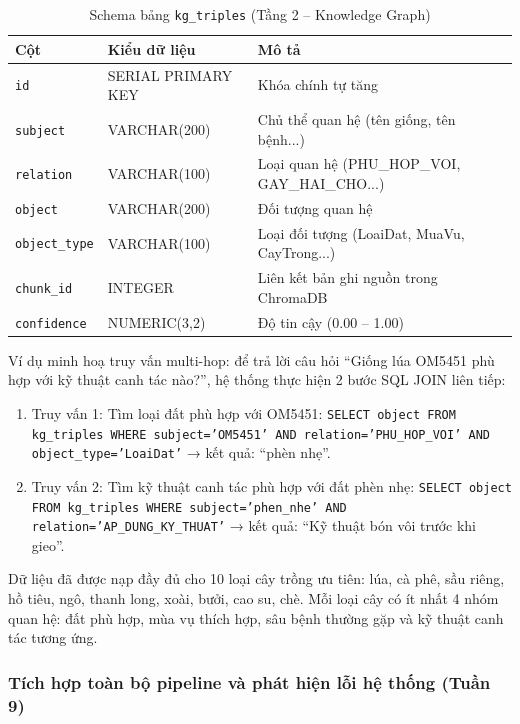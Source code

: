 \begin{table}[H]
\caption{Schema bảng \texttt{kg\_triples} (Tầng 2 -- Knowledge Graph)}
\label{tab:schema-kg}
\centering
\begin{tabular}{|p{3.5cm}|p{2.5cm}|p{7.5cm}|}
\hline
\textbf{Cột} & \textbf{Kiểu dữ liệu} & \textbf{Mô tả} \\
\hline
\texttt{id} & SERIAL PRIMARY KEY & Khóa chính tự tăng \\
\hline
\texttt{subject} & VARCHAR(200) & Chủ thể quan hệ (tên giống, tên bệnh...) \\
\hline
\texttt{relation} & VARCHAR(100) & Loại quan hệ (PHU\_HOP\_VOI, GAY\_HAI\_CHO...) \\
\hline
\texttt{object} & VARCHAR(200) & Đối tượng quan hệ \\
\hline
\texttt{object\_type} & VARCHAR(100) & Loại đối tượng (LoaiDat, MuaVu, CayTrong...) \\
\hline
\texttt{chunk\_id} & INTEGER & Liên kết bản ghi nguồn trong ChromaDB \\
\hline
\texttt{confidence} & NUMERIC(3,2) & Độ tin cậy (0.00 -- 1.00) \\
\hline
\end{tabular}
\end{table}

Ví dụ minh hoạ truy vấn multi-hop: để trả lời câu hỏi ``Giống lúa OM5451 phù hợp với kỹ thuật canh tác nào?'', hệ thống thực hiện 2 bước SQL JOIN liên tiếp:

\begin{enumerate}
    \item Truy vấn 1: Tìm loại đất phù hợp với OM5451: \texttt{SELECT object FROM kg\_triples WHERE subject='OM5451' AND relation='PHU\_HOP\_VOI' AND object\_type='LoaiDat'} → kết quả: ``phèn nhẹ''.
    \item Truy vấn 2: Tìm kỹ thuật canh tác phù hợp với đất phèn nhẹ: \texttt{SELECT object FROM kg\_triples WHERE subject='phen\_nhe' AND relation='AP\_DUNG\_KY\_THUAT'} → kết quả: ``Kỹ thuật bón vôi trước khi gieo''.
\end{enumerate}

Dữ liệu đã được nạp đầy đủ cho 10 loại cây trồng ưu tiên: lúa, cà phê, sầu riêng, hồ tiêu, ngô, thanh long, xoài, bưởi, cao su, chè. Mỗi loại cây có ít nhất 4 nhóm quan hệ: đất phù hợp, mùa vụ thích hợp, sâu bệnh thường gặp và kỹ thuật canh tác tương ứng.

\subsubsection{Tích hợp toàn bộ pipeline và phát hiện lỗi hệ thống (Tuần 9)}

